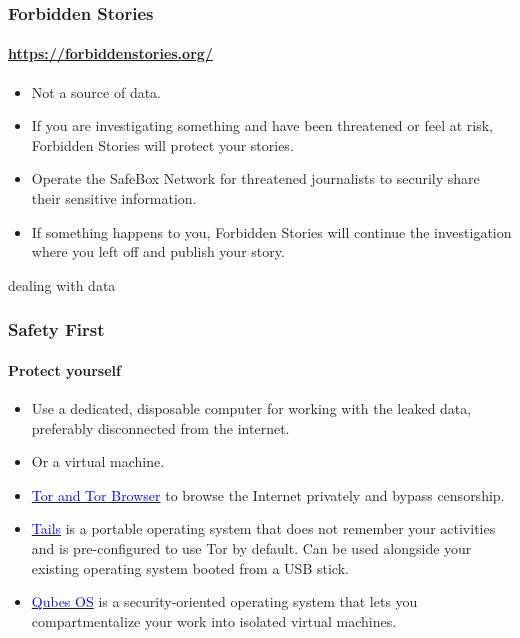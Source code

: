 \documentclass[aspectratio=169,usenames,dvipsnames]{beamer}
\begin{document}
\begin{frame}
  \frametitle{Forbidden Stories}
  \framesubtitle{\url{https://forbiddenstories.org/}}

  \begin{itemize}[<+->]
    \item Not a source of data.
    \item If you are investigating something and have been threatened or feel
      at risk, Forbidden Stories will protect your stories.
    \item Operate the SafeBox Network for threatened journalists to securily
      share their sensitive information.
    \item If something happens to you, Forbidden Stories will continue the
      investigation where you left off and publish your story.
  \end{itemize}

\end{frame}

\begin{frame}[c]

  \LARGE
  \centering
  dealing with data

\end{frame}

\begin{frame}
  \frametitle{Safety First}
  \framesubtitle{Protect yourself}

  \begin{itemize}[<+->]
    \item Use a dedicated, disposable computer for working with the leaked
      data, preferably disconnected from the internet.
    \item Or a virtual machine.
    \item \href{https://www.torproject.org/}{\textcolor{blue}{Tor and Tor
      Browser}} to browse the Internet privately and bypass censorship.
    \item \href{https://tails.boum.org/}{\textcolor{blue}{Tails}} is a
      portable operating system that does not remember your activities
      and is pre-configured to use Tor by default. Can be used alongside your
      existing operating system booted from a USB stick.
    \item \href{https://www.qubes-os.org/}{\textcolor{blue}{Qubes OS}} is a
      security-oriented operating system that lets you compartmentalize your
      work into isolated virtual machines.
  \end{itemize}

\end{frame}
\end{document}
